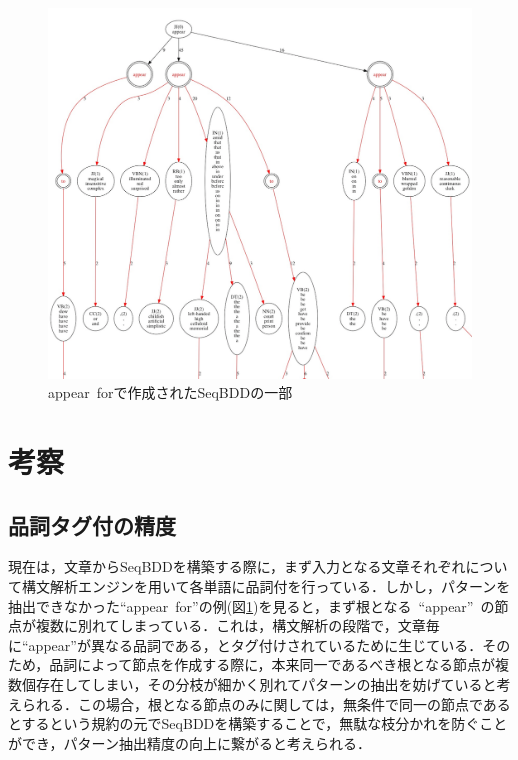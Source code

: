 \documentclass[12pt,twoside, fleqn]{ujbook}
\begin{document}
	\begin{figure}[htbp]
	\begin{center}
		\includegraphics [clip, width=19cm, angle=90]{./img/appear_for.png}
		\caption{appear\ forで作成されたSeqBDDの一部}
		\label{fig:appearfor}
	\end{center}
	\end{figure}	


	\newpage
	\section{考察}
	\label{text:kousatu}
	\subsection{品詞タグ付の精度}
	現在は，文章からSeqBDDを構築する際に，まず入力となる文章それぞれについて構文解析エンジンを用いて各単語に品詞付を行っている．しかし，パターンを抽出できなかった``appear\ for''の例(図\ref{fig:appearfor})を見ると，まず根となる\ ``appear''\ の節点が複数に別れてしまっている．これは，構文解析の段階で，文章毎に``appear''が異なる品詞である，とタグ付けされているために生じている．そのため，品詞によって節点を作成する際に，本来同一であるべき根となる節点が複数個存在してしまい，その分枝が細かく別れてパターンの抽出を妨げていると考えられる．この場合，根となる節点のみに関しては，無条件で同一の節点であるとするという規約の元でSeqBDDを構築することで，無駄な枝分かれを防ぐことができ，パターン抽出精度の向上に繋がると考えられる．\\
\end{document}
